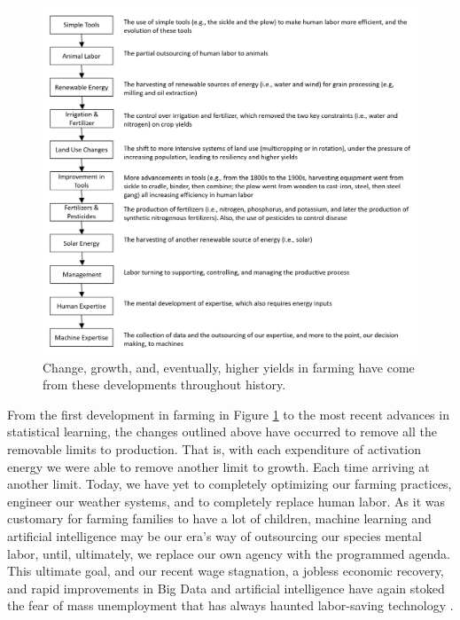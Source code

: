 \begin{figure}[ht]
	\centering
	\includegraphics[width=\textwidth,trim={0 0 0 0},clip=true]{Plots/farmingsteps.png}
	\caption{Change, growth, and, eventually, higher yields in farming have come from these developments throughout history.} 
	\label{fig:farmingsteps}
\end{figure}

From the first development in farming in Figure \ref{fig:farmingsteps} to the most recent advances in statistical learning, the changes outlined above have occurred to remove all the removable limits to production. That is, with each expenditure of activation energy we were able to remove another limit to growth. Each time arriving at another limit. Today, we have yet to completely optimizing our farming practices, engineer our weather systems, and to completely replace human labor. As it was customary for farming families to have a lot of children, machine learning and artificial intelligence may be our era's way of outsourcing our species mental labor, until, ultimately, we replace our own agency with the programmed agenda. This ultimate goal, and our recent wage stagnation, a jobless economic recovery, and rapid improvements in Big Data and artificial intelligence have again stoked the fear of mass unemployment that has always haunted labor-saving technology \cite{frase2016four}. 








